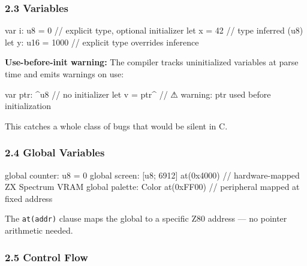 \documentclass[
  11pt,
]{article}
\newenvironment{Shaded}{\begin{snugshade}}{\end{snugshade}}
\newcommand{\NormalTok}[1]{#1}
\begin{document}
\hypertarget{variables}{%
\subsubsection{2.3 Variables}\label{variables}}

\begin{Shaded}
\begin{Highlighting}[]
\NormalTok{var i: u8 = 0       // explicit type, optional initializer}
\NormalTok{let x = 42          // type inferred (u8)}
\NormalTok{let y: u16 = 1000   // explicit type overrides inference}
\end{Highlighting}
\end{Shaded}

\textbf{Use-before-init warning:} The compiler tracks uninitialized
variables at parse time and emits warnings on use:

\begin{Shaded}
\begin{Highlighting}[]
\NormalTok{var ptr: \^{}u8          // no initializer}
\NormalTok{let v = ptr\^{}          // ⚠ warning: ptr used before initialization}
\end{Highlighting}
\end{Shaded}

This catches a whole class of bugs that would be silent in C.

\hypertarget{global-variables}{%
\subsubsection{2.4 Global Variables}\label{global-variables}}

\begin{Shaded}
\begin{Highlighting}[]
\NormalTok{global counter: u8 = 0}
\NormalTok{global screen: [u8; 6912] at(0x4000)   // hardware{-}mapped ZX Spectrum VRAM}
\NormalTok{global palette: Color at(0xFF00)        // peripheral mapped at fixed address}
\end{Highlighting}
\end{Shaded}

The \texttt{at(addr)} clause maps the global to a specific Z80 address
--- no pointer arithmetic needed.

\hypertarget{control-flow}{%
\subsubsection{2.5 Control Flow}\label{control-flow}}
\end{document}
